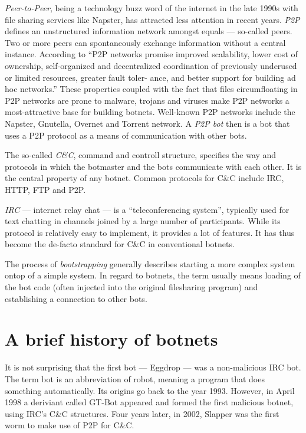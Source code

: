 \documentclass{llncs}
\begin{document}
{\it Peer-to-Peer}, being a technology buzz word of the internet in
the late 1990s with file sharing services like Napster\cite{napster},
has attracted less attention in recent years. {\it P2P } defines an
unstructured information network amongst equals --- so-called
peers. Two or more peers can spontaneously exchange information
without a central instance. According to \cite{schoder2005core} ``P2P
networks promise improved scalability, lower cost of ownership,
self-organized and decentralized coordination of previously underused
or limited resources, greater fault toler- ance, and better support
for building ad hoc networks.''  These properties coupled with the
fact that files circumfloating in P2P networks are prone to malware,
trojans and viruses make P2P networks a most-attractive base for
building botnets.  Well-known P2P networks include the
Napster\cite{napster}, Gnutella, Overnet and Torrent network.  A {\it
  P2P bot} then is a bot that uses a P2P protocol as a means of
communication with other bots.

The so-called {\it C\&C}, command and controll structure, specifies
the way and protocols in which the botmaster and the bots communicate
with each other. It is the central property of any botnet. Common
protocols for C\&C include IRC, HTTP, FTP and P2P.\cite{borgaonkar2010analysis}

{\it IRC} --- internet relay chat --- is a ``teleconferencing
system''\cite{irc}, typically used for text chatting in channels
joined by a large number of participants. While its protocol is
relatively easy to implement, it provides a lot of features. It has
thus become the de-facto standard for C\&C in conventional botnets.

The process of {\it bootstrapping} generally describes starting a more
complex system ontop of a simple system. In regard to botnets, the
term usually means loading of the bot code (often injected into the
original filesharing program) and establishing a connection to other
bots.\cite{wang2009systematic}

\section{A brief history of botnets}
It is not surprising that the first bot --- Eggdrop --- was a
non-malicious IRC bot. The term bot is an abbreviation of robot,
meaning a program that does something automatically. Its origins go
back to the year 1993. However, in April 1998 a deriviant called
GT-Bot appeared and formed the first malicious botnet, using IRC's
C\&C structures. Four years later, in 2002, Slapper was the first worm
to make use of P2P for C\&C.\cite{li2009botnet}
\end{document}
